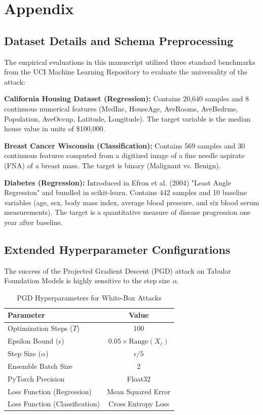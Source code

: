 \section{Appendix}
\subsection{Dataset Details and Schema Preprocessing}
The empirical evaluations in this manuscript utilized three standard benchmarks from the UCI Machine Learning Repository to evaluate the universality of the attack:

\textbf{California Housing Dataset (Regression):}
Contains 20,640 samples and 8 continuous numerical features (MedInc, HouseAge, AveRooms, AveBedrms, Population, AveOccup, Latitude, Longitude). The target variable is the median house value in units of \$100,000. 

\textbf{Breast Cancer Wisconsin (Classification):}
Contains 569 samples and 30 continuous features computed from a digitized image of a fine needle aspirate (FNA) of a breast mass. The target is binary (Malignant vs. Benign).

\textbf{Diabetes (Regression):}
Introduced in Efron et al. (2004) "Least Angle Regression" and bundled in scikit-learn. Contains 442 samples and 10 baseline variables (age, sex, body mass index, average blood pressure, and six blood serum measurements). The target is a quantitative measure of disease progression one year after baseline.

\subsection{Extended Hyperparameter Configurations}
The success of the Projected Gradient Descent (PGD) attack on Tabular Foundation Models is highly sensitive to the step size $\alpha$. 

\begin{table}[h]
\centering
\caption{PGD Hyperparameters for White-Box Attacks}
\begin{tabular}{lc}
\toprule
\textbf{Parameter} & \textbf{Value} \\
\midrule
Optimization Steps ($T$) & 100 \\
Epsilon Bound ($\epsilon$) & $0.05 \times \text{Range}(X_c)$ \\
Step Size ($\alpha$) & $\epsilon / 5$ \\
Ensemble Batch Size & 2 \\
PyTorch Precision & Float32 \\
Loss Function (Regression) & Mean Squared Error \\
Loss Function (Classification) & Cross Entropy Loss \\
\bottomrule
\end{tabular}
\end{table}

